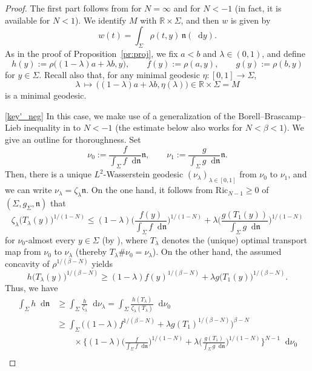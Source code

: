 \documentclass[sts]{imsart}
\theoremstyle{definition}
\theoremstyle{remark}
\newcommand{\R}{\mathbb{R}}
\newcommand{\fn}{\mathfrak{n}}
\newcommand{\lra}{\longrightarrow}
\newcommand{\Ric}{\mathrm{Ric}}
\newcommand*\diff{\mathop{}\!\mathrm{d}}
\begin{document}
\begin{proof}  
The first part follows from \cite[Theorem~1.1]{FLZ} for $N=\infty$ and \cite[Corollary~1.3]{Wy} for $N<-1$ (in fact, it is available for $N<1$).
We identify $M$ with $\R\times \Sigma$, and then $w$ is given by
\[
w(t) =\int_\Sigma \rho(t,y) \,\fn(\diff y).
\]
As in the proof of Proposition~\ref{pr:proj}, we fix $a<b$ and $\lambda \in (0,1)$, and define
\[
h(y) := \rho\bigl( (1-\lambda)a +\lambda b,y \bigr), \qquad
f(y) := \rho(a,y), \qquad
g(y) := \rho(b,y)
\]
for $y \in \Sigma$.
Recall also that, for any minimal geodesic $\eta\colon [0,1] \lra \Sigma$,
\[
\lambda \,\longmapsto\, \bigl( (1-\lambda)a +\lambda b,\eta(\lambda) \bigr) \in \R \times \Sigma =M
\]
is a minimal geodesic.

\eqref{key'_neg}
In this case, we make use of a generalization of the Borell--Brascamp--Lieb inequality in \cite{bacher2010borell,CMS01} to $N<-1$ (the estimate below also works for $N<\beta<1$).
We give an outline for thoroughness.
Set
\[
\nu_0 :=\frac{f}{\int_\Sigma f \diff\fn} \fn, \qquad
\nu_1 :=\frac{g}{\int_\Sigma g \diff\fn} \fn.
\]
Then, there is a unique $L^2$-Wasserstein geodesic $(\nu_{\lambda})_{\lambda \in [0,1]}$ from $\nu_0$ to $\nu_1$, and we can write $\nu_{\lambda}=\zeta_{\lambda} \fn$.
On the one hand, it follows from $\Ric_{N-1} \ge 0$ of $(\Sigma,g_{\Sigma},\fn)$ that
\[
\zeta_{\lambda} \bigl( T_{\lambda}(y) \bigr)^{1/(1-N)}
\le (1-\lambda) \biggl( \frac{f(y)}{\int_\Sigma f \diff\fn} \biggr)^{1/(1-N)}
 +\lambda \biggl( \frac{g(T_1(y))}{\int_\Sigma g \diff\fn} \biggr)^{1/(1-N)}
\]
for $\nu_0$-almost every $y \in \Sigma$
(by \cite[(4.7), (4.9)]{Oneg}), where $T_{\lambda}$ denotes the (unique) optimal transport map from $\nu_0$ to $\nu_{\lambda}$ (thereby $T_\lambda \# \nu_0 =\nu_\lambda$).
On the other hand, the assumed concavity of $\rho^{1/(\beta -N)}$ yields
\[
 h\bigl( T_{\lambda}(y) \bigr)^{1/(\beta-N)} \ge (1-\lambda) f(y)^{1/(\beta-N)} +\lambda g\bigl( T_1(y) \bigr)^{1/(\beta-N)}. 
\]
Thus, we have
\begin{align*}
\int_\Sigma h \diff\fn
&\ge \int_\Sigma \frac{h}{\zeta_\lambda} \diff\nu_\lambda
 = \int_\Sigma \frac{h(T_\lambda)}{\zeta_\lambda (T_\lambda)} \diff\nu_0 \\
&\ge \int_\Sigma \bigl( (1-\lambda) f^{1/(\beta-N)} +\lambda g(T_1)^{1/(\beta-N)} \bigr)^{\beta -N} \\
&\qquad \times \biggl\{ (1-\lambda) \biggl( \frac{f}{\int_\Sigma f \diff\fn} \biggr)^{1/(1-N)}
 +\lambda \biggl( \frac{g(T_1)}{\int_\Sigma g \diff\fn} \biggr)^{1/(1-N)} \biggr\}^{N-1} \diff\nu_0 \\

\end{align*}
\end{proof}
\end{document}

